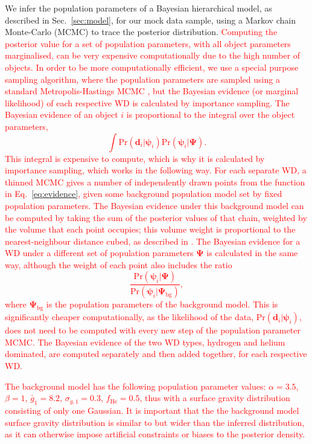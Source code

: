 \documentclass[fleqn,usenatbib]{mnras}
\newcommand{\changes}[1]{\textcolor{red}{#1}}
\newcommand{\popp}{\boldsymbol{\Psi}}
\newcommand{\objp}{\boldsymbol{\psi}}
\newcommand{\data}{\mathbf{d}}
\newcommand{\pr}{\text{Pr}}
\begin{document}
We infer the population parameters of a Bayesian hierarchical model, as described in Sec.~\ref{sec:model}, for our mock data sample, using a Markov chain Monte-Carlo (MCMC) to trace the posterior distribution. \changes{Computing the posterior value for a set of population parameters, with all object parameters marginalised, can be very expensive computationally due to the high number of objects. In order to be more computationally efficient, we use a special purpose sampling algorithm, where the population parameters are sampled using a standard Metropolis-Hastings MCMC \citep{BayesianDataAnalysis}, but the Bayesian evidence (or marginal likelihood) of each respective WD is calculated by importance sampling. The Bayesian evidence of an object $i$ is proportional to the integral over the object parameters,
\begin{equation}\label{eq:evidence}
	\int \pr(\data_i|\objp_i) \pr(\objp_i | \popp).
\end{equation}
This integral is expensive to compute, which is why it is calculated by importance sampling, which works in the following way. For each separate WD, a thinned MCMC gives a number of independently drawn points from the function in Eq.~\eqref{eq:evidence}, given some background population model set by fixed population parameters. The Bayesian evidence under this background model can be computed by taking the sum of the posterior values of that chain, weighted by the volume that each point occupies; this volume weight is proportional to the nearest-neighbour distance cubed, as described in \cite{2017arXiv170403472H}. The Bayesian evidence for a WD under a different set of population parameters $\popp$ is calculated in the same way, although the weight of each point also includes the ratio
\begin{equation}\label{eq:weight}
	\frac{\pr(\objp_i | \popp)}{\pr(\objp_i | \popp_\text{bg})},
\end{equation}
where $\popp_\text{bg}$ is the population parameters of the background model. This is significantly cheaper computationally, as the likelihood of the data, $\pr(\data_i|\objp_i)$, does not need to be computed with every new step of the population parameter MCMC. The Bayesian evidence of the two WD types, hydrogen and helium dominated, are computed separately and then added together, for each respective WD.}

 \changes{
The background model has the following population parameter values: $\alpha = 3.5$, $\beta = 1$, $\bar{g}_1 = 8.2$, $\sigma_{g,1} = 0.3$, $f_\text{He} = 0.5$, thus with a surface gravity distribution consisting of only one Gaussian. It is important that the the background model surface gravity distribution is similar to but wider than the inferred distribution, as it can otherwise impose artificial constraints or biases to the posterior density.}
\end{document}
